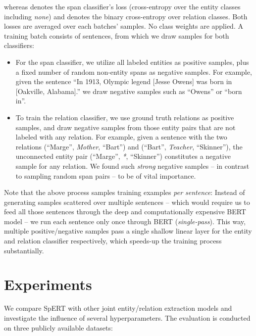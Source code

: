 \documentclass{ecai}
\begin{document}
whereas  denotes the span classifier's loss (cross-entropy over the entity classes including {\it none}) and  denotes the binary cross-entropy over relation classes. Both losses are averaged over each batches' samples. No class weights are applied.
A training batch consists of  sentences, from which we draw samples for both classifiers: \begin{itemize}
    \item For the span classifier, we utilize all labeled entities  as positive samples, plus a fixed number  of random non-entity spans as negative samples. For example, given the sentence \enquote{In 1913, Olympic legend  [Jesse Owens] was born in [Oakville, Alabama].} we draw negative samples such as \enquote{Owens} or \enquote{born in}.
    \item To train the relation classifier, we use ground truth relations as positive samples, and draw  negative samples from those entity pairs  that are not labeled with any relation. For example, given a sentence with the two relations (\enquote{Marge}, \emph{Mother}, \enquote{Bart}) and  (\enquote{Bart}, \emph{Teacher}, \enquote{Skinner}), the unconnected entity pair (\enquote{Marge}, \emph{*}, \enquote{Skinner})  constitutes a negative sample for any relation.
We found such {\it strong} negative samples -- in contrast to sampling random span pairs -- to be of vital importance.
\end{itemize}
Note that the above process samples training examples {\it per sentence}: Instead of generating samples scattered over multiple sentences -- which would require us to feed all those sentences through the deep and computationally expensive BERT model -- 
we run each sentence only once through BERT (\textit{single-pass}). This way, multiple positive/negative samples pass a single shallow linear layer for the entity and relation classifier respectively, which speeds-up the training process substantially. 







\section{Experiments}




We compare SpERT with other joint entity/relation extraction models and investigate the influence of several hyperparameters. The evaluation is conducted on three publicly available datasets: 
\end{document}
